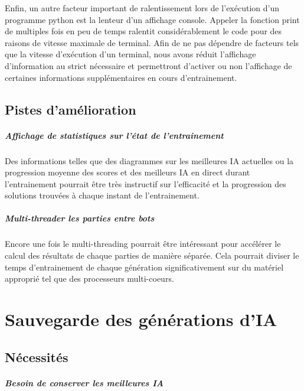 \documentclass{scrreprt}
\begin{document}
			Enfin, un autre facteur important de ralentissement lors de l'exécution d'un programme python est la lenteur d'un affichage console. Appeler la fonction print de multiples fois en peu de temps ralentit considérablement le code pour des raisons de vitesse maximale de terminal. Afin de ne pas dépendre de facteurs tels que la vitesse d'exécution d'un terminal, nous avons réduit l'affichage d'information au strict nécessaire et permettront d'activer ou non l'affichage de certaines informations supplémentaires en cours d'entrainement.
			
			
		\section{Pistes d'amélioration}
			\paragraph{Affichage de statistiques sur l'état de l'entrainement}
			
			Des informations telles que des diagrammes sur les meilleures IA actuelles ou la progression moyenne des scores et des meilleurs IA en direct durant l'entrainement pourrait être très instructif sur l'efficacité et la progression des solutions trouvées à chaque instant de l'entrainement.
			
			
			\paragraph{Multi-threader les parties entre bots}
			
			Encore une fois le multi-threading pourrait être intéressant pour accélérer le calcul des résultats de chaque parties de manière séparée. Cela pourrait diviser le temps d'entrainement de chaque génération significativement sur du matériel approprié tel que des processeurs multi-coeurs.
		
		
	\chapter{Sauvegarde des générations d'IA}
		\section{Nécessités}
			
			\paragraph{Besoin de conserver les meilleures IA}
			
\end{document}
